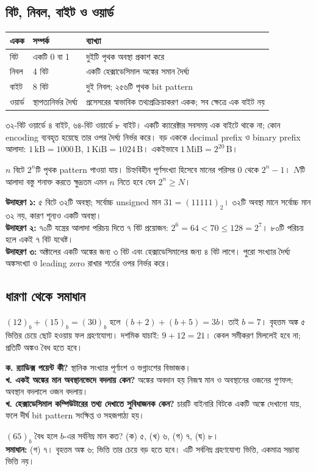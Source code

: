\subsection{বিট, নিবল, বাইট ও ওয়ার্ড}
\begin{center}\begin{tabularx}{\linewidth}{|L{.18\linewidth}|L{.22\linewidth}|Y|}\hline
{}একক&সম্পর্ক&ব্যাখ্যা\\\hline
বিট&একটি 0 বা 1&দুইটি পৃথক অবস্থা প্রকাশ করে\\\hline
নিবল&4 বিট&একটি হেক্সাডেসিমাল অঙ্কের সমান দৈর্ঘ্য\\\hline
বাইট&8 বিট&দুই নিবল; ২৫৬টি পৃথক bit pattern\\\hline
ওয়ার্ড&স্থাপত্যনির্ভর দৈর্ঘ্য&প্রসেসরের স্বাভাবিক তথ্যপ্রক্রিয়াকরণ একক; সব ক্ষেত্রে এক বাইট নয়\\\hline
\end{tabularx}\end{center}
৩২-বিট ওয়ার্ডে ৪ বাইট, ৬৪-বিট ওয়ার্ডে ৮ বাইট। একটি ক্যারেক্টার সবসময় এক বাইটে থাকে না; কোন encoding ব্যবহৃত হয়েছে তার ওপর দৈর্ঘ্য নির্ভর করে। বড় এককে decimal prefix ও binary prefix আলাদা: $1\,\mathrm{kB}=1000\,\mathrm{B}$, $1\,\mathrm{KiB}=1024\,\mathrm{B}$। একইভাবে $1\,\mathrm{MiB}=2^{20}\,\mathrm{B}$।

$n$ বিটে $2^n$টি পৃথক pattern পাওয়া যায়। চিহ্নবিহীন পূর্ণসংখ্যা হিসেবে মানের পরিসর $0$ থেকে $2^n-1$। $N$টি আলাদা বস্তু শনাক্ত করতে ক্ষুদ্রতম এমন $n$ নিতে হবে যেন $2^n\ge N$।

\textbf{উদাহরণ ১:} ৫ বিটে ৩২টি অবস্থা; সর্বোচ্চ unsigned মান $31=(11111)_2$। ৩২টি অবস্থা মানে সর্বোচ্চ মান ৩২ নয়, কারণ শূন্যও একটি অবস্থা।\\
\textbf{উদাহরণ ২:} ৭০টি যন্ত্রের আলাদা পরিচয় দিতে ৭ বিট প্রয়োজন: $2^6=64<70\le128=2^7$। ৮০টি পরিচয় হলে একই ৭ বিট যথেষ্ট।\\
\textbf{উদাহরণ ৩:} অক্টালের একটি অঙ্কের জন্য ৩ বিট এবং হেক্সাডেসিমালের জন্য ৪ বিট লাগে। পুরো সংখ্যার দৈর্ঘ্য অঙ্কসংখ্যা ও leading zero রাখার শর্তের ওপর নির্ভর করে।

\subsection{ধারণা থেকে সমাধান}
$(12)_b+(15)_b=(30)_b$ হলে $(b+2)+(b+5)=3b$। তাই $b=7$। বৃহত্তম অঙ্ক ৫ ভিত্তির চেয়ে ছোট হওয়ায় ফল গ্রহণযোগ্য। দশমিক যাচাই: $9+12=21$। কেবল সমীকরণ মিললেই হবে না; প্রতিটি অঙ্কও বৈধ হতে হবে।

\textbf{ক. র‍্যাডিক্স পয়েন্ট কী?} স্থানিক সংখ্যার পূর্ণাংশ ও ভগ্নাংশের বিভাজক।\\
\textbf{খ. একই অঙ্কের মান অবস্থানভেদে বদলায় কেন?} অঙ্কের অবদান হয় নিজস্ব মান ও অবস্থানের ওজনের গুণফল; অবস্থান বদলালে ওজন বদলায়।\\
\textbf{খ. হেক্সাডেসিমাল কম্পিউটারের তথ্য দেখাতে সুবিধাজনক কেন?} চারটি বাইনারি বিটকে একটি অঙ্কে দেখানো যায়, ফলে দীর্ঘ bit pattern সংক্ষিপ্ত ও সহজপাঠ্য হয়।

$(65)_b$ বৈধ হলে $b$-এর সর্বনিম্ন মান কত? (ক) ৫, (খ) ৬, (গ) ৭, (ঘ) ৮।\\
\textbf{সমাধান:} (গ) ৭। বৃহত্তম অঙ্ক ৬; ভিত্তি তার চেয়ে বড় হতে হবে। এটি সর্বনিম্ন গ্রহণযোগ্য ভিত্তি, একমাত্র সম্ভাব্য ভিত্তি নয়।
